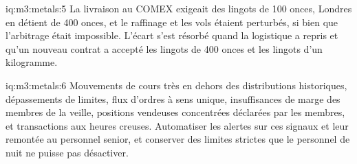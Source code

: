 \begin{solution}{iq:m3:metals:5}
La livraison au COMEX exigeait des lingots de 100 onces, Londres en détient de 400 onces, et le raffinage et les vols étaient
perturbés, si bien que l'arbitrage était impossible. L'écart s'est résorbé quand la logistique a repris et qu'un nouveau contrat
a accepté les lingots de 400 onces et les lingots d'un kilogramme.
\end{solution}

\begin{solution}{iq:m3:metals:6}
Mouvements de cours très en dehors des distributions historiques, dépassements de limites, flux d'ordres à sens unique, insuffisances de marge des
membres de la veille, positions vendeuses concentrées déclarées par les membres, et
transactions aux heures creuses. Automatiser les alertes sur ces signaux et leur remontée au personnel senior, et conserver des limites strictes
que le personnel de nuit ne puisse pas désactiver.
\end{solution}
